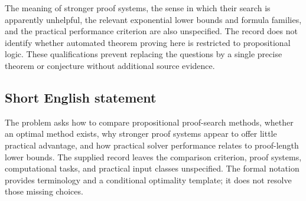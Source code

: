 \documentclass[11pt]{article}
\begin{document}
The meaning of stronger proof systems, the sense in which their search is apparently unhelpful, the relevant exponential lower bounds and formula families, and the practical performance criterion are also unspecified. The record does not identify whether automated theorem proving here is restricted to propositional logic. These qualifications prevent replacing the questions by a single precise theorem or conjecture without additional source evidence.
\subsection{Short English statement}
The problem asks how to compare propositional proof-search methods, whether an optimal method exists, why stronger proof systems appear to offer little practical advantage, and how practical solver performance relates to proof-length lower bounds. The supplied record leaves the comparison criterion, proof systems, computational tasks, and practical input classes unspecified. The formal notation provides terminology and a conditional optimality template; it does not resolve those missing choices.
\end{document}
